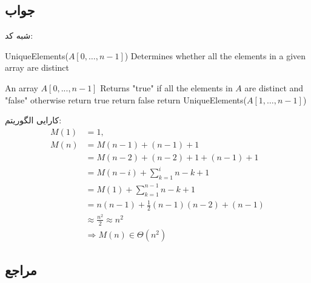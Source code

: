 \documentclass[]{article}
\begin{document}
\subsection*{جواب}
شبه کد:
    
    \begin{latin}
        \begin{algorithm}
        \caption{UniqueElements($A[0, \ldots, n - 1]$)
        Determines whether all the elements in a given array are distinct}\label{alg:cap} 
        \begin{algorithmic}
            \Require An array $A[0, ..., n-1]$
            \Ensure Returns "true" if all the elements in $A$ are distinct and "false" otherwise 
                \State return true
                \State return false
            \Else
                \State return UniqueElements($A[1, \ldots, n-1]$)
            \EndIf
        \end{algorithmic}
        \end{algorithm}
    \end{latin}

کارایی الگوریتم:
    \begin{align}
        M(1) &= 1,\\
        M(n) &= M(n-1) + (n-1) + 1\\
        &= M(n-2) + (n-2) + 1 + (n-1) + 1 \\
        &= M(n-i) + \sum_{k=1}^i n - k + 1\\
        &= M(1) + \sum_{k=1}^{n-1} n - k + 1\\
        &= n(n-1) + \frac{1}{2}(n-1)(n-2) + (n-1)\\
        &\approx \frac{n^2}{2} \approx n^2\\
        &\Rightarrow M(n) \in \Theta(n^2)
    \end{align}
\subsection*{مراجع}
\end{document}
